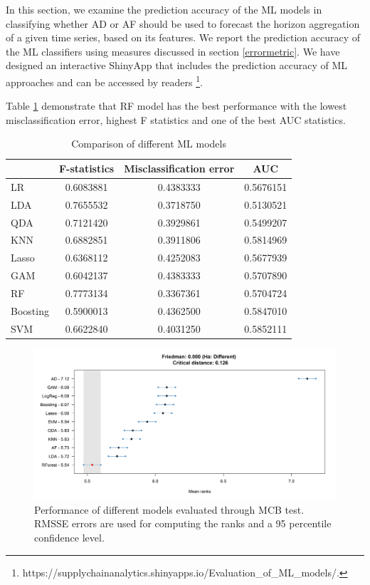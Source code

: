\documentclass[preprint, 3p,
authoryear]{elsarticle} %
\begin{document}
In this section, we examine the prediction accuracy of the ML models in
classifying whether AD or AF should be used to forecast the horizon
aggregation of a given time series, based on its features. We report the
prediction accuracy of the ML classifiers using measures discussed in
section \ref{errormetric}. We have designed an interactive ShinyApp that
includes the prediction accuracy of ML approaches and can be accessed by
readers \footnote{https://supplychainanalytics.shinyapps.io/Evaluation\_of\_ML\_models/.}.

Table \ref{tab:cost} demonstrate that RF model has the best performance
with the lowest misclassification error, highest F statistics and one of
the best AUC statistics.

\begin{table}
\caption{\label{tab:cost}Comparison of different ML models}
\centering
\begin{tabular}[t]{lccc}
\hline
 & F-statistics & Misclassification error & AUC\\
\hline
LR &  0.6083881 &  0.4383333 & 0.5676151\\
\hline
LDA & 0.7655532 & 0.3718750 & 0.5130521\\
\hline
QDA &  0.7121420 & 0.3929861 & 0.5499207\\
\hline
KNN &  0.6882851 & 0.3911806 & 0.5814969\\
\hline
Lasso & 0.6368112 & 0.4252083 & 0.5677939\\
\hline
GAM &  0.6042137 & 0.4383333 & 0.5707890\\
\hline
RF & 0.7773134 & 0.3367361 & 0.5704724\\
\hline
Boosting & 0.5900013 & 0.4362500 & 0.5847010\\
\hline
SVM & 0.6622840 & 0.4031250 & 0.5852111\\
\hline
\end{tabular}
\end{table}

\begin{figure}[H]

{\centering \includegraphics[width=1\linewidth]{img/300dpi/Fig_MCB_all} 

}

\caption{Performance of different models evaluated through MCB test. RMSSE errors are used for computing the ranks and a 95 percentile confidence level.}\label{fig:MCB_ML}
\end{figure}
\end{document}
